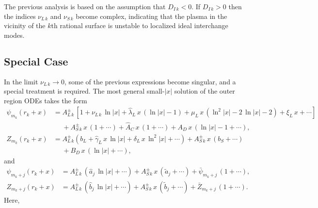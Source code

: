 \documentclass[12pt,prb,aps]{revtex4-1}
\begin{document}
The previous analysis is based on the assumption that $ D_{I\,k}< 0$.
 If $D_{I\,k}>0$ then the indices $\nu_{L\,k}$ and $\nu_{S\,k}$ become
complex, indicating that the plasma in the vicinity of the $k$th rational surface is unstable to localized ideal interchange modes. \cite{mercier}

\subsection{Special Case}\label{sspec}
In the limit $\nu_{L\,k}\rightarrow 0$, some of the previous expressions become singular, and a special treatment is required. The most general small-$|x|$ solution of the outer region ODEs 
takes the form
\begin{align}
\psi_{m_k}(r_k+x)&=A_{L\,k}^\pm \,[1+\nu_{L\,k}\,\ln|x|+\hat{\lambda}_{L}\,x\,(\ln |x|-1)+\mu_{L}\,x\,(\ln^2\!|x|-2\,\ln|x|-2) + \xi_{L}\,x+\cdots]  \nonumber\\[0.5ex]&\phantom{=}+ A_{S\,k}^{\pm}\,x\,(1+\cdots) + \hat{A}_{C}\,x\,(1+\cdots)+ A_{D}\,x\,(\ln |x|-1 + \cdots),\\[0.5ex]
Z_{m_k}(r_k+x)&= A_{L\,k}^\pm\left(b_L+\hat{\gamma}_{L}\,x\,\ln |x|+\delta_{L}\,x\,\ln^2\!|x|+\cdots\right) +A_{S\,k}^\pm\,x\,(b_{S}+\cdots)\nonumber\\[0.5ex]&\phantom{=} + B_{D}\,x\,(\ln |x|+\cdots),
\end{align}
and 
\begin{align}
\psi_{m_k+j}(r_k+x)&=A_{L\,k}^\pm\,(\hat{a}_j\,\ln |x|+\cdots)+A_{S\,k}^\pm\,x\,(\tilde{a}_j+\cdots)  + \bar{\psi}_{m_k+j}\,(1+\cdots),\\[0.5ex]
Z_{m_k+j}(r_k+x)&= A_{L\,k}^\pm\,(\hat{b}_j \,\ln |x|+ \cdots) +  A_{S\,k}^\pm\,x\,(\tilde{b}_j + \cdots) +\bar{Z}_{m_k+j}\,(1+\cdots).
\end{align}
Here, 
\end{document}
